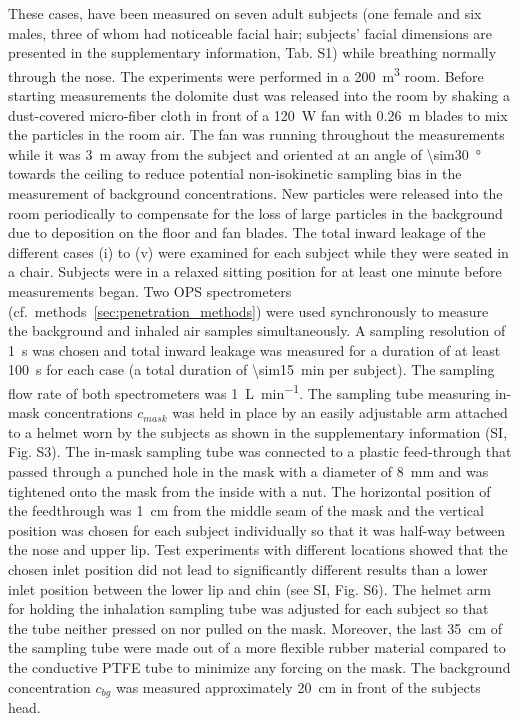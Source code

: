 \documentclass[preprint]{elsarticle}
\begin{document}
These cases, have been measured on seven adult subjects (one female and six males, three of whom had noticeable facial hair; subjects' facial dimensions are presented in the supplementary information, Tab. S1) while breathing normally through the nose.
The experiments were performed in a \SI{200}{\cubic \meter} room. Before starting measurements the dolomite dust was released into the room by shaking a dust-covered micro-fiber cloth in front of a \SI{120}{\watt} fan with \SI{0.26}{\meter} blades to mix the particles in the room air.
The fan was running throughout the measurements while it was \SI{3}{\meter} away from the subject and oriented at an angle of \SI{\sim30}{\degree} towards the ceiling to reduce potential non-isokinetic sampling bias in the measurement of background concentrations. 
New particles were released into the room periodically to compensate for the loss of large particles in the background due to deposition on the floor and fan blades. The total inward leakage of the different cases (i) to (v) were examined for each subject while they were seated in a chair. Subjects were in a relaxed sitting position for at least one minute before measurements began. 
Two OPS spectrometers (cf.\ methods~\ref{sec:penetration_methods}) were used synchronously to measure the background and inhaled air samples simultaneously. 
A sampling resolution of \SI{1}{\second} was chosen and total inward leakage was measured for a duration of at least \SI{100}{\second} for each case (a total duration of \SI{\sim15}{\minute} per subject). 
The sampling flow rate of both spectrometers was \SI{1}{\liter \per \minute}. The sampling tube measuring in-mask concentrations $c_{mask}$ was held in place by an easily adjustable arm attached to a helmet worn by the subjects as shown in the supplementary information (SI, Fig. S3). 
The in-mask sampling tube was connected to a plastic feed-through that passed through a punched hole in the mask with a diameter of \SI{8}{\milli\meter} and was tightened onto the mask from the inside with a nut. 
The horizontal position of the feedthrough was \SI{1}{\centi\meter} from the middle seam of the mask and the vertical position was chosen for each subject individually so that it was half-way between the nose and upper lip. Test experiments with different locations  showed that the chosen inlet position did not lead to significantly different results than a lower inlet position between the lower lip and chin (see SI, Fig. S6).
The helmet arm for holding the inhalation sampling tube was adjusted for each subject so that the tube neither pressed on nor pulled on the mask. Moreover, the last \SI{35}{\centi \meter} of the sampling tube were made out of a more flexible rubber material compared to the conductive PTFE tube to minimize any forcing on the mask. The background concentration $c_{bg}$ was measured approximately \SI{20}{\centi \meter} in front of the subjects head.
\end{document}
